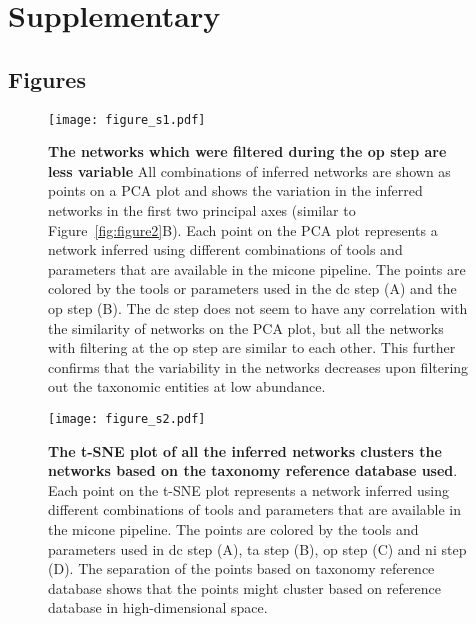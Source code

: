 
\newpage
\section*{Supplementary}

  \renewcommand{\thefigure}{S\arabic{figure}}
  \setcounter{figure}{0}

  \renewcommand{\thetable}{S\arabic{table}}
  \setcounter{table}{0}

  

  \subsection*{Figures}

    \begin{figure}[H]
      \centering
      \texttt{[image: figure\_s1.pdf]}
    \end{figure}
    \begin{figure}[H]
      \centering
        \caption{
          \textbf{The networks which were filtered during the \ac{op} step are less variable}
          All combinations of inferred networks are shown as points on a PCA plot and shows the variation in the inferred networks in the first two principal axes (similar to Figure~\ref{fig:figure2}B).
          Each point on the PCA plot represents a network inferred using different combinations of tools and parameters that are available in the \ac{micone} pipeline.
          The points are colored by the tools or parameters used in the \ac{dc} step (A) and the \ac{op} step (B).
          The \ac{dc} step does not seem to have any correlation with the similarity of networks on the PCA plot, but all the networks with filtering at the \ac{op} step are similar to each other.
          This further confirms that the variability in the networks decreases upon filtering out the taxonomic entities at low abundance.
        }
      \label{fig:figure_s1}
    \end{figure}
    \FloatBarrier
    \newpage

    \begin{figure}[H]
      \centering
      \texttt{[image: figure\_s2.pdf]}
    \end{figure}
    \begin{figure}[H]
      \centering
        \caption{
          \textbf{The t-SNE plot of all the inferred networks clusters the networks based on the taxonomy reference database used}.
          Each point on the t-SNE plot represents a network inferred using different combinations of tools and parameters that are available in the \ac{micone} pipeline.
          The points are colored by the tools and parameters used in \ac{dc} step (A), \ac{ta} step (B), \ac{op} step (C) and \ac{ni} step (D).
          The separation of the points based on taxonomy reference database shows that the points might cluster based on reference database in high-dimensional space.
        }
      \label{fig:figure_s2}
    \end{figure}
    \FloatBarrier
    \newpage

